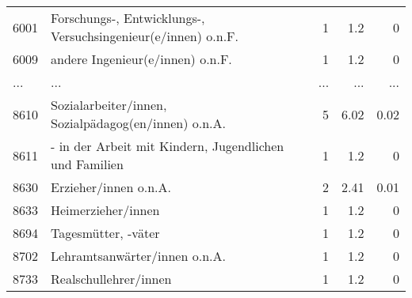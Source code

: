 \begin{longtable}{lXrrr}
        6001 & \multicolumn{1}{X}{Forschungs-, Entwicklungs-, Versuchsingenieur(e/innen) o.n.F.} & %
          \num{1} &
          \num[round-mode=places,round-precision=2]{1.2} &
          \num[round-mode=places,round-precision=2]{0} \\
        6009 & \multicolumn{1}{X}{andere Ingenieur(e/innen) o.n.F.} & %
          \num{1} &
          \num[round-mode=places,round-precision=2]{1.2} &
          \num[round-mode=places,round-precision=2]{0} \\
       ... & ... & ... & ... & ... \\
        8610 & \multicolumn{1}{X}{Sozialarbeiter/innen, Sozialpädagog(en/innen) o.n.A.} & %
          \num{5} &
          \num[round-mode=places,round-precision=2]{6.02} &
          \num[round-mode=places,round-precision=2]{0.02} \\

        8611 & \multicolumn{1}{X}{- in der Arbeit mit Kindern, Jugendlichen und Familien} & %
          \num{1} &
          \num[round-mode=places,round-precision=2]{1.2} &
          \num[round-mode=places,round-precision=2]{0} \\

        8630 & \multicolumn{1}{X}{Erzieher/innen o.n.A.} & %
          \num{2} &
          \num[round-mode=places,round-precision=2]{2.41} &
          \num[round-mode=places,round-precision=2]{0.01} \\

        8633 & \multicolumn{1}{X}{Heimerzieher/innen} & %
          \num{1} &
          \num[round-mode=places,round-precision=2]{1.2} &
          \num[round-mode=places,round-precision=2]{0} \\

        8694 & \multicolumn{1}{X}{Tagesmütter, -väter} & %
          \num{1} &
          \num[round-mode=places,round-precision=2]{1.2} &
          \num[round-mode=places,round-precision=2]{0} \\

        8702 & \multicolumn{1}{X}{Lehramtsanwärter/innen o.n.A.} & %
          \num{1} &
          \num[round-mode=places,round-precision=2]{1.2} &
          \num[round-mode=places,round-precision=2]{0} \\

        8733 & \multicolumn{1}{X}{Realschullehrer/innen} & %
          \num{1} &
          \num[round-mode=places,round-precision=2]{1.2} &
          \num[round-mode=places,round-precision=2]{0} \\


\end{longtable}
